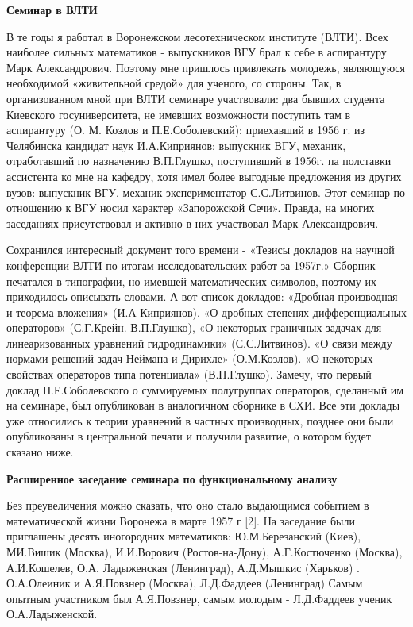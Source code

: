 {\bf Семинар в ВЛТИ}

В те годы я работал в Воронежском лесотехническом институте (ВЛТИ). Всех наиболее сильных математиков - выпускников ВГУ брал к себе в аспирантуру Марк Александрович. Поэтому мне пришлось привлекать молодежь, являющуюся необходимой «живительной средой» для ученого, со стороны. Так, в организованном мной при ВЛТИ семинаре участвовали: два бывших студента Киевского госуниверситета, не имевших возможности поступить там в аспирантуру (О. М. Козлов и П.Е.Соболевский): приехавший в 1956 г. из Челябинска кандидат наук И.А.Киприянов; выпускник ВГУ, механик, отработавший по назначению В.П.Глушко, поступивший в 1956г. па полставки ассистента ко мне на кафедру, хотя имел более выгодные предложения из других вузов: выпускник ВГУ. механик-экспериментатор С.С.Литвинов. Этот семинар по отношению к ВГУ носил характер «Запорожской Сечи». Правда, на многих заседаниях присутствовал и активно в них участвовал Марк Александрович.

Сохранился интересный документ того времени - «Тезисы докладов на научной конференции ВЛТИ по итогам исследовательских работ за 1957г.» Сборник печатался в типографии, но имевшей математических символов, поэтому их приходилось описывать словами. А вот список докладов: «Дробная производная и теорема вложения» (И.А Киприянов). «О дробных степенях дифференциальных операторов» (С.Г.Крейн. В.П.Глушко), «О некоторых граничных задачах для линеаризованных уравнений гидродинамики» (С.С.Литвинов). «О связи между нормами решений задач Неймана и Дирихле» (О.М.Козлов). «О некоторых свойствах операторов типа потенциала» (В.П.Глушко). Замечу, что первый доклад П.Е.Соболевского о суммируемых полугруппах операторов, сделанный им на семинаре, был опубликован в аналогичном сборнике в СХИ. Все эти доклады уже относились к теории уравнений в частных производных, позднее они были опубликованы в центральной печати и получили развитие, о котором будет сказано ниже.

{\bf Расширенное заседание семинара по функциональному анализу}

Без преувеличения можно сказать, что оно стало выдающимся событием в математической жизни Воронежа в марте 1957 г [2]. На заседание были приглашены десять иногородних математиков: Ю.М.Березанский (Киев), МИ.Вишик (Москва), И.И.Ворович (Ростов-на-Дону), А.Г.Костюченко (Москва), А.И.Кошелев, О.А. Ладыженская (Ленинград), А.Д.Мышкис (Харьков) . О.А.Олеиник и А.Я.Повзнер (Москва), Л.Д.Фаддеев (Ленинград) Самым опытным участником был А.Я.Повзнер, самым молодым - Л.Д.Фаддеев ученик О.А.Ладыженской.

